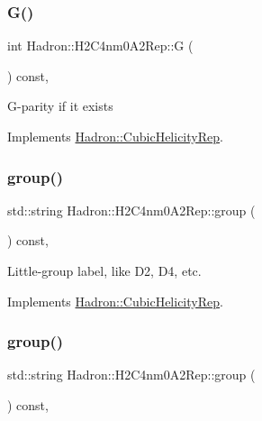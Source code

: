 \subsubsection{\texorpdfstring{G()}{G()}\hspace{0.1cm}{\footnotesize\ttfamily [3/3]}}
{\footnotesize\ttfamily int Hadron\+::\+H2\+C4nm0\+A2\+Rep\+::G (\begin{DoxyParamCaption}{ }\end{DoxyParamCaption}) const\hspace{0.3cm}{\ttfamily [inline]}, {\ttfamily [virtual]}}

G-\/parity if it exists 

Implements \mbox{\hyperlink{structHadron_1_1CubicHelicityRep_a50689f42be1e6170aa8cf6ad0597018b}{Hadron\+::\+Cubic\+Helicity\+Rep}}.

\mbox{\label{structHadron_1_1H2C4nm0A2Rep_a91188ca54be99a0d11ac82323d7637ce}} 
\subsubsection{\texorpdfstring{group()}{group()}\hspace{0.1cm}{\footnotesize\ttfamily [1/5]}}
{\footnotesize\ttfamily std\+::string Hadron\+::\+H2\+C4nm0\+A2\+Rep\+::group (\begin{DoxyParamCaption}{ }\end{DoxyParamCaption}) const\hspace{0.3cm}{\ttfamily [inline]}, {\ttfamily [virtual]}}

Little-\/group label, like D2, D4, etc. 

Implements \mbox{\hyperlink{structHadron_1_1CubicHelicityRep_a101a7d76cd8ccdad0f272db44b766113}{Hadron\+::\+Cubic\+Helicity\+Rep}}.

\mbox{\label{structHadron_1_1H2C4nm0A2Rep_a91188ca54be99a0d11ac82323d7637ce}} 
\subsubsection{\texorpdfstring{group()}{group()}\hspace{0.1cm}{\footnotesize\ttfamily [2/5]}}
{\footnotesize\ttfamily std\+::string Hadron\+::\+H2\+C4nm0\+A2\+Rep\+::group (\begin{DoxyParamCaption}{ }\end{DoxyParamCaption}) const\hspace{0.3cm}{\ttfamily [inline]}, {\ttfamily [virtual]}}

